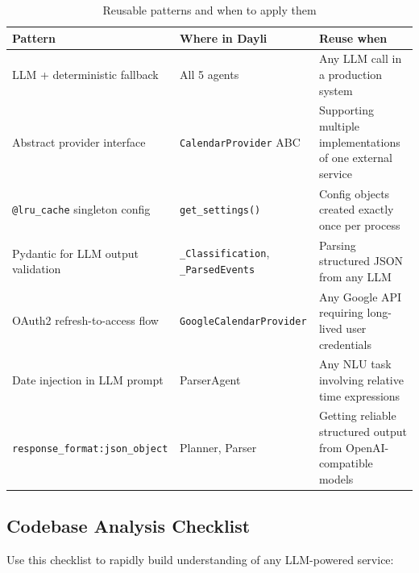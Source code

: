 \documentclass[12pt, a4paper]{article}
\begin{document}
\begin{table}[htbp]
\centering
\small
\renewcommand{\arraystretch}{1.45}
\begin{tabularx}{\textwidth}{L{4.0cm} L{3.5cm} X}
\toprule
\textbf{Pattern} & \textbf{Where in Dayli} & \textbf{Reuse when} \\
\midrule
LLM + deterministic fallback
  & All 5 agents
  & Any LLM call in a production system \\
Abstract provider interface
  & \texttt{CalendarProvider} ABC
  & Supporting multiple implementations of one external service \\
\texttt{@lru\_cache} singleton config
  & \texttt{get\_settings()}
  & Config objects created exactly once per process \\
Pydantic for LLM output validation
  & \texttt{\_Classification}, \texttt{\_ParsedEvents}
  & Parsing structured JSON from any LLM \\
OAuth2 refresh-to-access flow
  & \texttt{Google\-Calendar\-Provider}
  & Any Google API requiring long-lived user credentials \\
Date injection in LLM prompt
  & ParserAgent
  & Any NLU task involving relative time expressions \\
\texttt{response\_format:}\newline\texttt{json\_object}
  & Planner, Parser
  & Getting reliable structured output from OpenAI-compatible models \\
\bottomrule
\end{tabularx}
\caption{Reusable patterns and when to apply them}
\end{table}

\subsection{Codebase Analysis Checklist}

Use this checklist to rapidly build understanding of any LLM-powered service:
\end{document}
